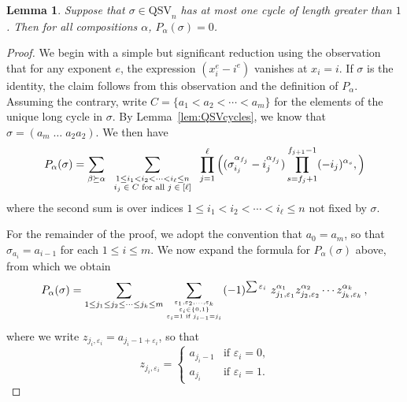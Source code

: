 \documentclass[12pt]{amsart}
\newtheorem{lem}[equation]{Lemma}
\theoremstyle{definition}
\theoremstyle{remark}
\numberwithin{equation}{section}
\renewcommand{\epsilon}{\varepsilon}
\newcommand{\QSV}{\mathrm{QSV}}
\begin{document}
\begin{lem}
\label{lem:onecyclevanishing}
Suppose that $\sigma \in \QSV_{n}$ has at most one cycle of length greater than $1$.  Then for all compositions $\alpha$, $P_{\alpha}(\sigma) = 0$.
\end{lem}
\begin{proof}
We begin with a simple but significant reduction using the observation that for any exponent $e$, the expression $(x_{i}^{e} - i^{e})$ vanishes at $x_{i} = i$.  If $\sigma$ is the identity, the claim follows from this observation and the definition of $P_{\alpha}$.  
Assuming the contrary, write $C = \{a_{1} < a_{2} < \cdots < a_{m}\}$ for the elements of the unique long cycle in $\sigma$.  By Lemma~\ref{lem:QSVcycles}, we know that $\sigma = (a_{m}\;\ldots\;a_{2}a_{2})$.  We then have
\begin{equation}
\label{eq:Patsigma1}
P_{\alpha}(\sigma) =  
\sum_{\beta \succeq \alpha}
\hspace{0.6em}
\sum_{\substack{ 1\le i_{1} < i_{2} < \cdots < i_{\ell} \le n \\ \text{$i_{j} \in C$ for all $j \in [\ell]$} }}
\hspace{0.6em}
\prod_{j = 1}^{\ell}
\Big(
(\sigma_{i_{j}}^{\alpha_{f_{j}}} - i_{j}^{\alpha_{f_{j}}}) 
\prod_{s = f_{j} + 1}^{f_{j+1} - 1} (- i_{j})^{\alpha_{s}},
\Big)
\end{equation}
where the second sum is over indices $1\le i_{1} < i_{2} < \cdots < i_{\ell} \le n$ not fixed by $\sigma$.  

For the remainder of the proof, we adopt the convention that $a_{0} = a_{m}$, so that $\sigma_{a_{i}} = a_{i-1}$ for each $1 \le i \le m$.  We now expand the formula for $P_{\alpha}(\sigma)$ above, from which we obtain
\begin{equation}\label{eq:Patsigma2}
	P_{\alpha}(\sigma)=
	\sum_{{1\le j_1\le j_2\le\cdots\le j_k\le m}} \sum_{{\epsilon_1,\epsilon_2,\ldots,\epsilon_k \atop \epsilon_i\in \{0,1\}}\atop \epsilon_i=1 \text{ if } j_{i-1}=j_i} (-1)^{\sum \epsilon_i}\ 
	   z_{j_1,\epsilon_1}^{\alpha_1}z_{j_2,\epsilon_2}^{\alpha_2} \cdots z_{j_k,\epsilon_k}^{\alpha_k}\,,
\end{equation}
where we write $z_{j_i,\epsilon_i} = a_{j_{i} - 1 + \epsilon_{i}}$, so that
\[
z_{j_i,\epsilon_i} = \begin{cases} a_{j_i-1} & \text{if $\epsilon_i=0$,} \\ a_{j_i} & \text{if $\epsilon_{i} = 1$.}  \end{cases} 
\]


\end{proof}
\end{document}
